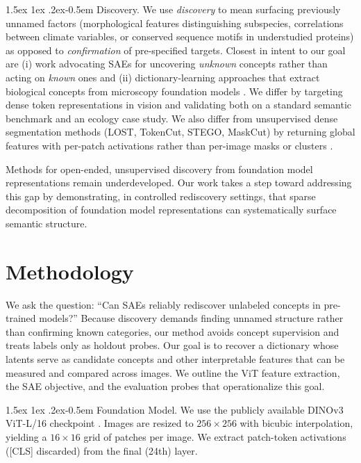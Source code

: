 \documentclass{article}
\makeatletter
\renewcommand{\paragraph}{%
  \@startsection{paragraph}{4}%
  {\z@}{1.5ex \@plus 1ex \@minus .2ex}{-0.5em}%
  {\normalfont\normalsize\bfseries}%
}
\theoremstyle{plain}
\theoremstyle{definition}
\theoremstyle{remark}
\makeatother
\begin{document}
\paragraph{Discovery.}
We use \emph{discovery} to mean surfacing previously unnamed factors (morphological features distinguishing subspecies, correlations between climate variables, or conserved sequence motifs in understudied proteins) as opposed to \emph{confirmation} of pre-specified targets.
Closest in intent to our goal are (i) work advocating SAEs for uncovering \emph{unknown} concepts rather than acting on \emph{known} ones \citep{peng2025unknown} and (ii) dictionary-learning approaches that extract biological concepts from microscopy foundation models \citep{donhauser2024towards}.
We differ by targeting dense token representations in vision and validating both on a standard semantic benchmark and an ecology case study.
We also differ from unsupervised dense segmentation methods (LOST, TokenCut, STEGO, MaskCut) by returning global features with per-patch activations rather than per-image masks or clusters \citep{simeoni2021lost,wang2023tokencut,hamilton2022stego,wang2023maskcut}.

Methods for open-ended, unsupervised discovery from foundation model representations remain underdeveloped.
Our work takes a step toward addressing this gap by demonstrating, in controlled rediscovery settings, that sparse decomposition of foundation model representations can systematically surface semantic structure.

\section{Methodology}

We ask the question: ``Can SAEs reliably rediscover unlabeled concepts in pre-trained models?''
Because discovery demands finding unnamed structure rather than confirming known categories, our method avoids concept supervision and treats labels only as holdout probes.
Our goal is to recover a dictionary whose latents serve as candidate concepts and other interpretable features that can be measured and compared across images.
We outline the ViT feature extraction, the SAE objective, and the evaluation probes that operationalize this goal.

\paragraph{Foundation Model.} We use the publicly available DINOv3 ViT-L/16 checkpoint \citep{simeoni2025dinov3}.
Images are resized to $256\times256$ with bicubic interpolation, yielding a $16\times16$ grid of patches per image.
We extract patch-token activations ([CLS] discarded) from the final (24th) layer. 
\end{document}
